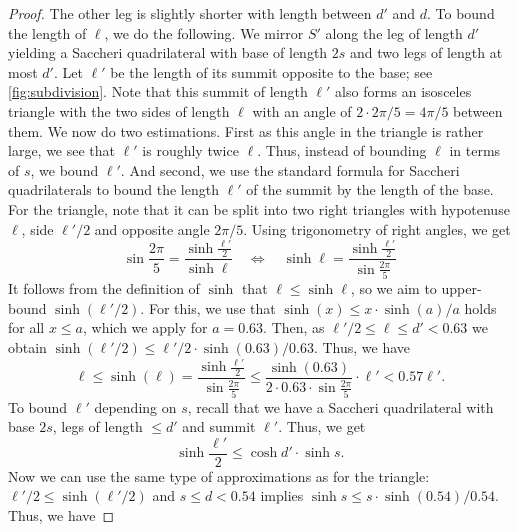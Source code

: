 \documentclass[11pt]{article}
\begin{document}
\begin{proof}
    The other leg is slightly shorter with length between $d'$ and $d$.
    To bound the length of $\ell$, we do the following.
    We mirror $S'$ along the leg of length $d'$ yielding a Saccheri quadrilateral with base of length $2s$ and two legs of length at most $d'$.
    Let $\ell'$ be the length of its summit opposite to the base; see \cref{fig:subdivision}.
    Note that this summit of length $\ell'$ also forms an isosceles triangle with the two sides of length $\ell$ with an angle of $2 \cdot 2\pi / 5 = 4 \pi / 5$ between them.
    We now do two estimations.
    First as this angle in the triangle is rather large, we see that $\ell'$ is roughly twice $\ell$.
    Thus, instead of bounding $\ell$ in terms of $s$, we bound $\ell'$.
    And second, we use the standard formula for Saccheri quadrilaterals to bound the length $\ell'$ of the summit by the length of the base.
%
    For the triangle, note that it can be split into two right triangles with hypotenuse $\ell$, side $\ell'/2$ and opposite angle $2\pi / 5$.
    Using trigonometry of right angles, we get
    \begin{equation*}
        \sin \frac{2 \pi}{5} = \frac{\sinh \frac{\ell'}{2} }{\sinh \ell}
        \quad \iff \quad
        \sinh \ell = \frac{\sinh \frac{\ell'}{2} }{\sin \frac{2 \pi}{5}}
    \end{equation*}
    It follows from the definition of $\sinh$ that $\ell \le \sinh \ell$, so we aim to upper-bound $ \sinh(\ell'/2) $.
    For this, we use that $ \sinh(x) \leq x \cdot \sinh(a) / a $  holds for all $ x \leq a $, which we apply for $ a = 0.63 $.
    Then, as $\ell' / 2 \le \ell \le d' < 0.63$ we obtain $\sinh(\ell' / 2) \le \ell' / 2 \cdot \sinh(0.63) / 0.63$.  Thus, we have
    \begin{equation*}
        \ell \le
        \sinh(\ell) =
        \frac{\sinh \frac{\ell'}{2} }{\sin \frac{2 \pi}{5}} \le
        \frac{\sinh (0.63)}{2 \cdot 0.63 \cdot \sin \frac{2 \pi}{5}} \cdot \ell'
        < 0.57 \ell'.
    \end{equation*}
%
    To bound $\ell'$ depending on $s$, recall that we have a Saccheri quadrilateral with base $2s$, legs of length $\le d'$ and summit $\ell'$.
    Thus, we get
    \begin{equation*}
        \sinh \frac{\ell'}{2} \le \cosh d' \cdot \sinh s.
    \end{equation*}
    Now we can use the same type of approximations as for the triangle: $\ell' / 2 \le \sinh(\ell' / 2)$ and $s \le d < 0.54$ implies $\sinh s \le s \cdot \sinh(0.54) / 0.54$.  Thus, we have 

\end{proof}
\end{document}
